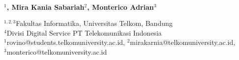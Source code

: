  
  \begin{center}
      \textbf{\large \Title}\\
      \bigskip 
  \end{center}
  
  
  
   \begin{center}
     \bf \Author$^1$, Mira Kania Sabariah$^2$, Monterico Adrian$^3$
  \end{center}
  
  
   \begin{center}
     $^{1,2,3}$Fakultas Informatika, Universitas Telkom, Bandung\\
$^4$Divisi Digital Service PT Telekomunikasi Indonesia\\
$^1$rovino@students.telkomuniversity.ac.id, $^2$mirakarnia@telkomuniversity.ac.id,\\ $^3$monterico@telkomuniversity.ac.id
  \end{center}
  
   
   
